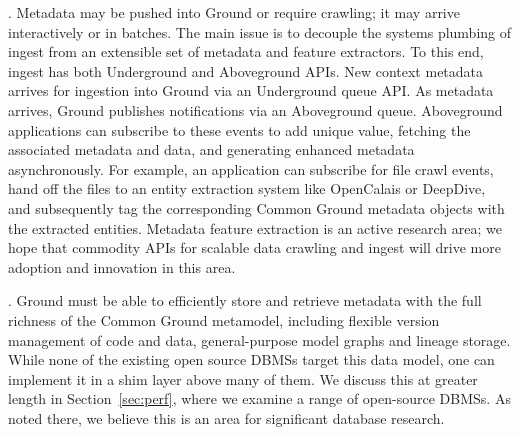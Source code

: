 \documentclass{sig-alternate}
\begin{document}
.  Metadata may be pushed into Ground or require crawling; it may arrive interactively or in batches. 
The main issue is to decouple the systems plumbing of ingest from an extensible set of metadata and feature extractors.
To this end, ingest has both Underground and Aboveground APIs.
New context metadata arrives for ingestion into Ground via an Underground queue API. 
As metadata arrives, Ground publishes notifications via an Aboveground queue. Aboveground applications can subscribe to these events to add unique value, fetching the associated metadata and data, and generating enhanced metadata asynchronously. 
For example, an application can subscribe for file crawl events, hand off the files to an entity extraction system like OpenCalais or DeepDive, and subsequently tag the corresponding Common Ground metadata objects with  the extracted entities.
Metadata feature extraction is an active research area; we hope that commodity APIs for scalable data crawling and ingest will drive more adoption and innovation in this area. 

.  Ground must be able to efficiently store and retrieve metadata with the full richness of the Common Ground metamodel, including flexible version management of code and data, general-purpose model graphs and lineage storage. 
While none of the existing open source DBMSs target this data model, one can implement it in a shim layer above many of them. 
We discuss this at greater length in Section~\ref{sec:perf}, where we examine a range of open-source DBMSs. As noted there, we believe this is an area for significant database research.
\end{document}
